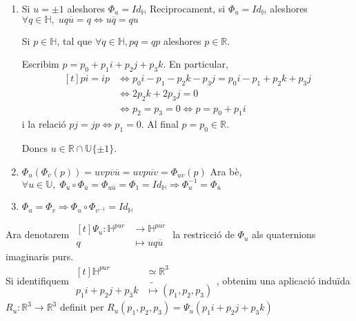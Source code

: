 \documentclass[a4paper,12pt]{article}
\begin{document}
	\begin{demostracio}
		\begin{enumerate}
			\item Si $u = \pm 1$ aleshores $\Phi_u = Id_\mathbb{H}$ Reciprocament, si $\Phi_u = Id_\mathbb{H}$ aleshores $\forall q \in \mathbb{H},\; uq\overline{u} = q \iff u\overline{q} = qu$
			\begin{lema}
				Si $p \in \mathbb{H}$, tal que $\forall q \in \mathbb{H}, pq = qp$ aleshores $p \in \mathbb{R}$.
			\end{lema}
			\begin{demostracio}
				Escribim $p = p_0 + p_1i + p_2j + p_3k$. En particular,
				\begin{displaymath}
					\begin{aligned}[t]
						pi = ip &\iff p_0i - p_1 - p_2k - p_3j = p_0i - p_1 + p_2k + p_3j\\
						&\iff 2p_2k + 2p_3j = 0\\
						&\iff p_2 = p_3 = 0 \iff p = p_0 + p_1i
					\end{aligned}
				\end{displaymath}
				i la relació $pj = jp \iff p_1 = 0$. Al final $p = p_0 \in \mathbb{R}$.
			\end{demostracio}
			Doncs $u \in \mathbb{R}\cap\mathbb{U} \{\pm 1\}$.
			\item $\Phi_u(\Phi_v(p)) = uvp\overline{v}\overline{u} = uvp\overline{uv} = \Phi_{uv}(p)$
			Ara bè, $\forall u \in \mathbb{U},\;\Phi_u\circ\Phi_{\overline{u}} = \Phi_{u\overline{u}} = \Phi_1 = Id_\mathbb{H} \Rightarrow \Phi_{u}^{-1} = \Phi_{\overline{u}}$
			\item $\Phi_u = \Phi_v \Rightarrow \Phi_u \circ \Phi_{v^{-1}} = Id_\mathbb{H}$
		\end{enumerate}
	\end{demostracio}
	Ara denotarem $\begin{aligned}[t]\Psi_u: \mathbb{H}^{pur} &\to \mathbb{H}^{pur}\\q &\mapsto uq\overline{u}\end{aligned}$ la restricció de $\Phi_u$ als quaternions imaginaris purs.\\
	Si identifiquem $\begin{aligned}[t]\mathbb{H}^{pur} &\simeq \mathbb{R}^3\\p_1i+p_2j+p_3k &\tilde{\mapsto} (p_1, p_2, p_3)\end{aligned}$, obtenim una aplicació induïda $R_u: \mathbb{R}^3 \to \mathbb{R}^3$ definit per $R_u(p_1, p_2, p_3) = \Psi_u(p_1i+p_2j+p_3k)$\\
\end{document}
